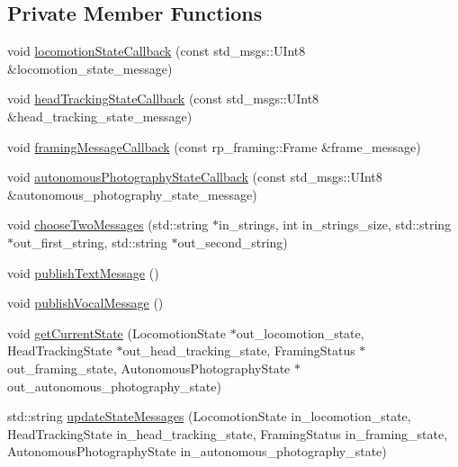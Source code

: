 \subsection*{\-Private \-Member \-Functions}
\begin{DoxyCompactItemize}
\item 
void \hyperlink{class_r_p_state_externalization_node_a72403c142739da98d758f6b809dc86bf}{locomotion\-State\-Callback} (const std\-\_\-msgs\-::\-U\-Int8 \&locomotion\-\_\-state\-\_\-message)
\item 
void \hyperlink{class_r_p_state_externalization_node_ac37120caee1bb806ecd671af709dbe61}{head\-Tracking\-State\-Callback} (const std\-\_\-msgs\-::\-U\-Int8 \&head\-\_\-tracking\-\_\-state\-\_\-message)
\item 
void \hyperlink{class_r_p_state_externalization_node_a84016e2e0334523723b988a55ec29052}{framing\-Message\-Callback} (const rp\-\_\-framing\-::\-Frame \&frame\-\_\-message)
\item 
void \hyperlink{class_r_p_state_externalization_node_a88b0e64adbc549a70e4dce23dad23043}{autonomous\-Photography\-State\-Callback} (const std\-\_\-msgs\-::\-U\-Int8 \&autonomous\-\_\-photography\-\_\-state\-\_\-message)
\item 
void \hyperlink{class_r_p_state_externalization_node_a12e4f0e139c07024cc4563873263007c}{choose\-Two\-Messages} (std\-::string $\ast$in\-\_\-strings, int in\-\_\-strings\-\_\-size, std\-::string $\ast$out\-\_\-first\-\_\-string, std\-::string $\ast$out\-\_\-second\-\_\-string)
\item 
void \hyperlink{class_r_p_state_externalization_node_a67e0f9ec2cd49bcd07263acf70e5a2cc}{publish\-Text\-Message} ()
\item 
void \hyperlink{class_r_p_state_externalization_node_a7f3dd3f0d600d4042195346d82a26988}{publish\-Vocal\-Message} ()
\item 
void \hyperlink{class_r_p_state_externalization_node_a82a72e8054dfa4260e5c5d14a95560d5}{get\-Current\-State} (\-Locomotion\-State $\ast$out\-\_\-locomotion\-\_\-state, \-Head\-Tracking\-State $\ast$out\-\_\-head\-\_\-tracking\-\_\-state, \-Framing\-Status $\ast$out\-\_\-framing\-\_\-state, \-Autonomous\-Photography\-State $\ast$out\-\_\-autonomous\-\_\-photography\-\_\-state)
\item 
std\-::string \hyperlink{class_r_p_state_externalization_node_a7dd21f6a61bdce4f0a0722771baf53b0}{update\-State\-Messages} (\-Locomotion\-State in\-\_\-locomotion\-\_\-state, \-Head\-Tracking\-State in\-\_\-head\-\_\-tracking\-\_\-state, \-Framing\-Status in\-\_\-framing\-\_\-state, \-Autonomous\-Photography\-State in\-\_\-autonomous\-\_\-photography\-\_\-state)
\end{DoxyCompactItemize}
